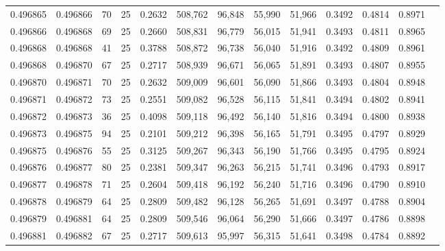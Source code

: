 \begin{tabular}{rrrrrrrrrrrrr}
0.496865 & 0.496866 &    70 &  25 &                                     0.2632 & 508,762 &  96,848 &  55,990 &  51,966 & 0.3492 & 0.4814 & 0.8971 \\
0.496866 & 0.496868 &    69 &  25 &                                     0.2660 & 508,831 &  96,779 &  56,015 &  51,941 & 0.3493 & 0.4811 & 0.8965 \\
0.496868 & 0.496868 &    41 &  25 &                                     0.3788 & 508,872 &  96,738 &  56,040 &  51,916 & 0.3492 & 0.4809 & 0.8961 \\
0.496868 & 0.496870 &    67 &  25 &                                     0.2717 & 508,939 &  96,671 &  56,065 &  51,891 & 0.3493 & 0.4807 & 0.8955 \\
0.496870 & 0.496871 &    70 &  25 &                                     0.2632 & 509,009 &  96,601 &  56,090 &  51,866 & 0.3493 & 0.4804 & 0.8948 \\
0.496871 & 0.496872 &    73 &  25 &                                     0.2551 & 509,082 &  96,528 &  56,115 &  51,841 & 0.3494 & 0.4802 & 0.8941 \\
0.496872 & 0.496873 &    36 &  25 &                                     0.4098 & 509,118 &  96,492 &  56,140 &  51,816 & 0.3494 & 0.4800 & 0.8938 \\
0.496873 & 0.496875 &    94 &  25 &                                     0.2101 & 509,212 &  96,398 &  56,165 &  51,791 & 0.3495 & 0.4797 & 0.8929 \\
0.496875 & 0.496876 &    55 &  25 &                                     0.3125 & 509,267 &  96,343 &  56,190 &  51,766 & 0.3495 & 0.4795 & 0.8924 \\
0.496876 & 0.496877 &    80 &  25 &                                     0.2381 & 509,347 &  96,263 &  56,215 &  51,741 & 0.3496 & 0.4793 & 0.8917 \\
0.496877 & 0.496878 &    71 &  25 &                                     0.2604 & 509,418 &  96,192 &  56,240 &  51,716 & 0.3496 & 0.4790 & 0.8910 \\
0.496878 & 0.496879 &    64 &  25 &                                     0.2809 & 509,482 &  96,128 &  56,265 &  51,691 & 0.3497 & 0.4788 & 0.8904 \\
0.496879 & 0.496881 &    64 &  25 &                                     0.2809 & 509,546 &  96,064 &  56,290 &  51,666 & 0.3497 & 0.4786 & 0.8898 \\
0.496881 & 0.496882 &    67 &  25 &                                     0.2717 & 509,613 &  95,997 &  56,315 &  51,641 & 0.3498 & 0.4784 & 0.8892 \\

\end{tabular}

